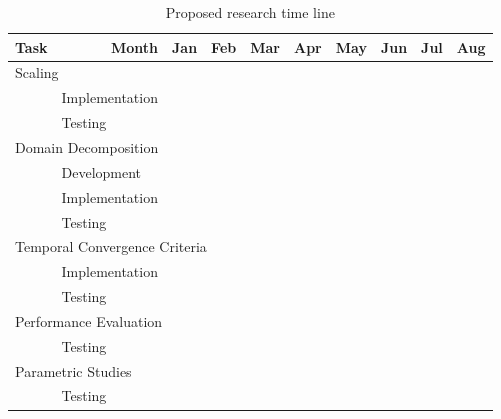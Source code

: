 \newcommand{\cc}{\cellcolor{black}}
\begin{table}[h]
\singlespace
\centering
\begin{tabular}{@{}l l c c c c  c c c c @{}} \toprule
Task & \multicolumn{1}{r}{Month} & Jan & Feb & Mar & Apr & May & Jun & Jul & Aug\\
\midrule
\multicolumn{10}{l}{Scaling}  \\
& Implementation & \cc & \cc &     &     &     &     &     &     \\
& Testing        &     & \cc & \cc &     &     &     &     &     \\
\multicolumn{10}{l}{Domain Decomposition} \\
& Development    & \cc & \cc &     &     &     &     &     &     \\
& Implementation &     & \cc & \cc & \cc &     &     &     &     \\
& Testing        &     &     &     & \cc & \cc &     &     &     \\
\multicolumn{10}{l}{Temporal Convergence Criteria}\\
& Implementation & \cc & \cc &     &     &     &     &     &     \\
& Testing        &     &     & \cc & \cc &     &     &     &     \\
\multicolumn{10}{l}{Performance Evaluation} \\
& Testing        &     &     &     &     & \cc & \cc & \cc &     \\
\multicolumn{10}{l}{Parametric Studies} \\
& Testing        &     &     &     &     &     & \cc & \cc &     \\
\bottomrule  
\end{tabular}
\caption{Proposed research time line}
\label{tab:time_line}
\end{table}
